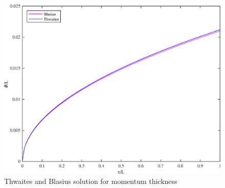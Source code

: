 



\begin{figure}[H]
\centering
\includegraphics[scale=0.53]{week_2/graphs/e1g1.eps}
\caption{Thwaites and Blasius solution for momentum thickness}
\label{e1g1}
\end{figure}